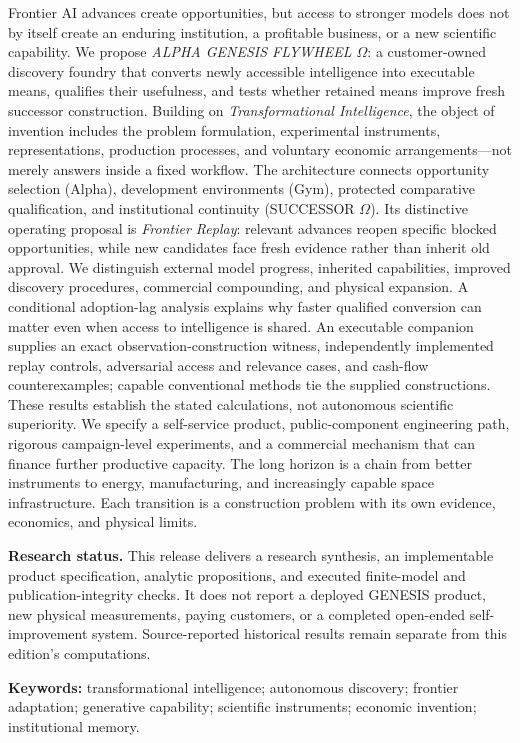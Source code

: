 \documentclass[11pt,letterpaper]{article}
\theoremstyle{remark}\newtheorem{remark}{Remark}[section]
\begin{document}
Frontier AI advances create opportunities, but access to stronger models does not by itself create an enduring institution, a profitable business, or a new scientific capability. We propose \emph{ALPHA GENESIS FLYWHEEL $\Omega$}: a customer-owned discovery foundry that converts newly accessible intelligence into executable means, qualifies their usefulness, and tests whether retained means improve fresh successor construction. Building on \emph{Transformational Intelligence}, the object of invention includes the problem formulation, experimental instruments, representations, production processes, and voluntary economic arrangements---not merely answers inside a fixed workflow. The architecture connects opportunity selection (Alpha), development environments (Gym), protected comparative qualification, and institutional continuity (SUCCESSOR $\Omega$). Its distinctive operating proposal is \emph{Frontier Replay}: relevant advances reopen specific blocked opportunities, while new candidates face fresh evidence rather than inherit old approval. We distinguish external model progress, inherited capabilities, improved discovery procedures, commercial compounding, and physical expansion. A conditional adoption-lag analysis explains why faster qualified conversion can matter even when access to intelligence is shared. An executable companion supplies an exact observation-construction witness, independently implemented replay controls, adversarial access and relevance cases, and cash-flow counterexamples; capable conventional methods tie the supplied constructions. These results establish the stated calculations, not autonomous scientific superiority. We specify a self-service product, public-component engineering path, rigorous campaign-level experiments, and a commercial mechanism that can finance further productive capacity. The long horizon is a chain from better instruments to energy, manufacturing, and increasingly capable space infrastructure. Each transition is a construction problem with its own evidence, economics, and physical limits.

\begin{statusbox}
\textbf{Research status.} This release delivers a research synthesis, an implementable product specification, analytic propositions, and executed finite-model and publication-integrity checks. It does not report a deployed GENESIS product, new physical measurements, paying customers, or a completed open-ended self-improvement system. Source-reported historical results remain separate from this edition's computations.
\end{statusbox}
\textbf{Keywords:} transformational intelligence; autonomous discovery; frontier adaptation; generative capability; scientific instruments; economic invention; institutional memory.
\end{document}
